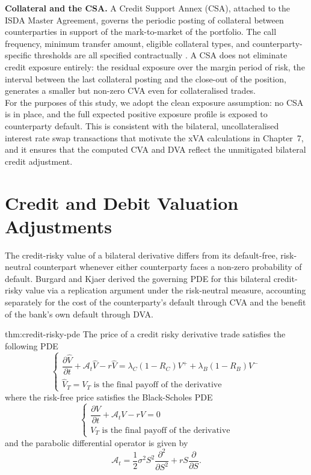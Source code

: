     \noindent
    \textbf{Collateral and the CSA.} A Credit Support Annex (CSA), attached to the ISDA Master Agreement, governs the periodic posting of collateral between counterparties in support of the mark-to-market of the portfolio. The call frequency, minimum transfer amount, eligible collateral types, and counterparty-specific thresholds are all specified contractually \cite{Green_2016}. A CSA does not eliminate credit exposure entirely: the residual exposure over the margin period of risk, the interval between the last collateral posting and the close-out of the position, generates a smaller but non-zero CVA even for collateralised trades. \\

    \noindent
    For the purposes of this study, we adopt the clean exposure assumption: no CSA is in place, and the full expected positive exposure profile is exposed to counterparty default. This is consistent with the bilateral, uncollateralised interest rate swap transactions that motivate the xVA calculations in Chapter~7, and it ensures that the computed CVA and DVA reflect the unmitigated bilateral credit adjustment.

    \section*{Credit and Debit Valuation Adjustments}
    \label{sec:cva-dva}

    \noindent
    The credit-risky value of a bilateral derivative differs from its default-free, risk-neutral counterpart whenever either counterparty faces a non-zero probability of default. Burgard and Kjaer \cite{pde_2011, burgard2011balance} derived the governing PDE for this bilateral credit-risky value via a replication argument under the risk-neutral measure, accounting separately for the cost of the counterparty's default through CVA and the benefit of the bank's own default through DVA.

    \begin{thmbox}{}{thm:credit-risky-pde}
        The price of a credit risky derivative trade satisfies the following PDE
        \[
        \left\{
        \begin{array}{l}
            \dfrac{\partial \hat{V}}{\partial t} + \mathcal{A}_t \hat{V} - r\hat{V} = \lambda_C(1-R_C)V^+ + \lambda_B(1-R_B)V^- \\[10pt]
            \hat{V}_T = V_T \text{ is the final payoff of the derivative}
        \end{array}
        \right.
        \]
        where the risk-free price satisfies the Black-Scholes PDE
        \[
        \left\{
        \begin{array}{l}
            \dfrac{\partial V}{\partial t} + \mathcal{A}_t V - rV = 0 \\[10pt]
            V_T \text{ is the final payoff of the derivative}
        \end{array}
        \right.
        \]
        and the parabolic differential operator is given by
        \[
            \mathcal{A}_t = \frac{1}{2}\sigma^2 S^2 \frac{\partial^2}{\partial S^2} + rS\frac{\partial}{\partial S}.
        \]
    \end{thmbox}


